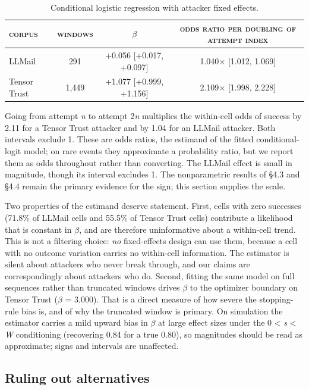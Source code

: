 \documentclass[conference]{IEEEtran}
\begin{document}
\begin{table}[t]
\centering
\caption{Conditional logistic regression with attacker fixed effects.}
\label{tab:3}
\small
\begin{tabular}{lccc}
\toprule
\textsc{corpus} & \textsc{windows} & \textsc{$\beta$} & \textsc{odds ratio per doubling of attempt index} \\
\midrule
LLMail & 291 & +0.056 [+0.017, +0.097] & 1.040$\times$ [1.012, 1.069] \\
Tensor Trust & 1,449 & +1.077 [+0.999, +1.156] & 2.109$\times$ [1.998, 2.228] \\
\bottomrule
\end{tabular}
\end{table}


Going from attempt \textit{n} to attempt 2\textit{n} multiplies the within-cell odds of success by 2.11 for a Tensor Trust attacker and by 1.04 for an LLMail attacker. Both intervals exclude 1. These are odds ratios, the estimand of the fitted conditional-logit model; on rare events they approximate a probability ratio, but we report them as odds throughout rather than converting. The LLMail effect is small in magnitude, though its interval excludes 1. The nonparametric results of \S4.3 and \S4.4 remain the primary evidence for the sign; this section supplies the scale.

Two properties of the estimand deserve statement. First, cells with zero successes (71.8\% of LLMail cells and 55.5\% of Tensor Trust cells) contribute a likelihood that is constant in $\beta$, and are therefore uninformative about a within-cell trend. This is not a filtering choice: \textit{no} fixed-effects design can use them, because a cell with no outcome variation carries no within-cell information. The estimator is silent about attackers who never break through, and our claims are correspondingly about attackers who do. Second, fitting the same model on full sequences rather than truncated windows drives $\beta$ to the optimizer boundary on Tensor Trust ($\beta$ = 3.000). That is a direct measure of how severe the stopping-rule bias is, and of why the truncated window is primary. On simulation the estimator carries a mild upward bias in \textbar{}$\beta$\textbar{} at large effect sizes under the 0 \textless{} \textit{s} \textless{} \textit{W} conditioning (recovering 0.84 for a true 0.80), so magnitudes should be read as approximate; signs and intervals are unaffected.


\subsection{Ruling out alternatives}
\end{document}
